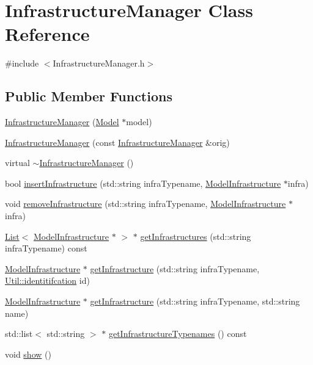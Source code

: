 \hypertarget{class_infrastructure_manager}{}\section{Infrastructure\+Manager Class Reference}
\label{class_infrastructure_manager}


{\ttfamily \#include $<$Infrastructure\+Manager.\+h$>$}

\subsection*{Public Member Functions}
\begin{DoxyCompactItemize}
\item 
\hyperlink{class_infrastructure_manager_a65067e32d70b63c7b0b46c61dcab6a22}{Infrastructure\+Manager} (\hyperlink{class_model}{Model} $\ast$model)
\item 
\hyperlink{class_infrastructure_manager_a091a712dc18339f9ea350519af229dba}{Infrastructure\+Manager} (const \hyperlink{class_infrastructure_manager}{Infrastructure\+Manager} \&orig)
\item 
virtual \hyperlink{class_infrastructure_manager_a5bca34aaf33a39c649ad3a1a9cd0ebf9}{$\sim$\+Infrastructure\+Manager} ()
\item 
bool \hyperlink{class_infrastructure_manager_a597f2262dee783093e616e3d8894690a}{insert\+Infrastructure} (std\+::string infra\+Typename, \hyperlink{class_model_infrastructure}{Model\+Infrastructure} $\ast$infra)
\item 
void \hyperlink{class_infrastructure_manager_a55ea1a348ec52d4ed1de3addf86b6d42}{remove\+Infrastructure} (std\+::string infra\+Typename, \hyperlink{class_model_infrastructure}{Model\+Infrastructure} $\ast$infra)
\item 
\hyperlink{class_list}{List}$<$ \hyperlink{class_model_infrastructure}{Model\+Infrastructure} $\ast$ $>$ $\ast$ \hyperlink{class_infrastructure_manager_a1d013b55994e27cac0c45c1ad08f74e0}{get\+Infrastructures} (std\+::string infra\+Typename) const 
\item 
\hyperlink{class_model_infrastructure}{Model\+Infrastructure} $\ast$ \hyperlink{class_infrastructure_manager_a2c957eee5107d521e8292cb6f8e9ea5b}{get\+Infrastructure} (std\+::string infra\+Typename, \hyperlink{class_util_ad17d458d9344b10bba64347e514d6d71}{Util\+::identitifcation} id)
\item 
\hyperlink{class_model_infrastructure}{Model\+Infrastructure} $\ast$ \hyperlink{class_infrastructure_manager_ab8663cae44cd58387391c1821c48beb7}{get\+Infrastructure} (std\+::string infra\+Typename, std\+::string name)
\item 
std\+::list$<$ std\+::string $>$ $\ast$ \hyperlink{class_infrastructure_manager_aaf3ff8d9288b333d21a202caae797bc7}{get\+Infrastructure\+Typenames} () const 
\item 
void \hyperlink{class_infrastructure_manager_a8e10fe1a6a40ce020b1b63232dbb05cd}{show} ()
\end{DoxyCompactItemize}


